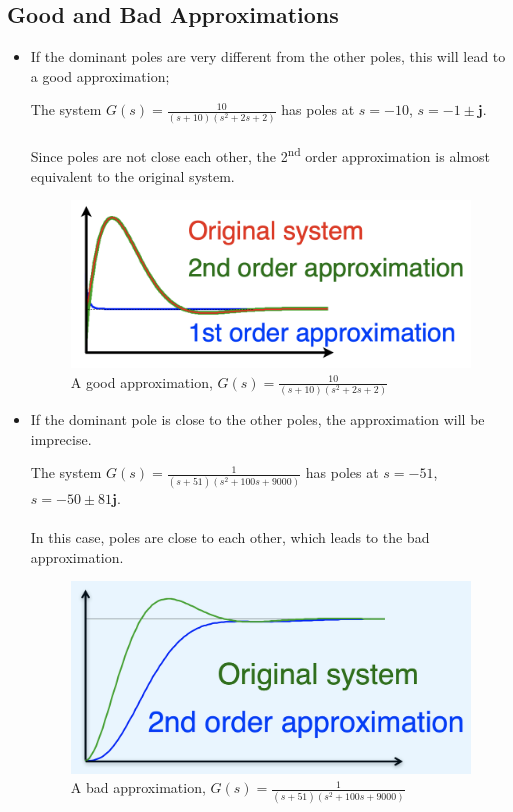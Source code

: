 \subsection{Good and Bad Approximations}
\begin{itemize}
    \item If the dominant poles are very different from the other poles, this will lead to a good approximation;
        \begin{ex}{}
            The system $\displaystyle G(s)=\frac{10}{(s+10)(s^{2}+2s+2)}$ has poles at $s = -10$, $s = -1 \pm \mathbf{j}$. \\\\Since poles are not close each other, the 2\textsuperscript{nd} order approximation is almost equivalent to the original system.
            \begin{figure}[H] \centering 
                \includegraphics[width=.4\textwidth]{images/good_approx.png}
                \caption{A good approximation, $G(s)=\frac{10}{(s+10)(s^{2}+2s+2)}$}
            \end{figure}
        \end{ex}
    
    \item If the dominant pole is close to the other poles, the approximation will be imprecise.
        \begin{ex}{}
            The system $\displaystyle G(s)=\frac{1}{(s+51)(s^{2}+100s+9000)}$ has poles at $s = -51$, $s = -50 \pm 81\mathbf{j}$.\\\\ In this case, poles are close to each other, which leads to the bad approximation.
            \begin{figure}[H] 
                \centering 
                \includegraphics[width=.4\textwidth]{images/bad_approx.png}
                \caption{A bad approximation, $G(s)=\frac{1}{(s+51)(s^{2}+100s+9000)}$}
            \end{figure}
        \end{ex}
\end{itemize}
